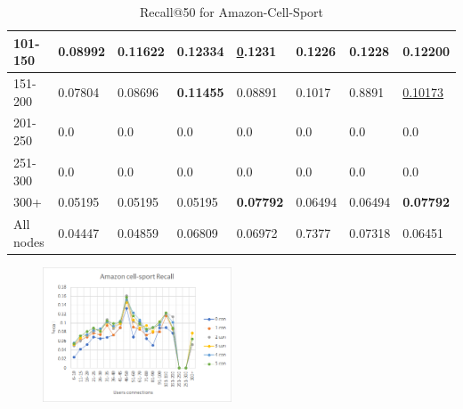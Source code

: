 \begin{table}[]
\begin{tabular}{|l|l|l|l|l|l|l||l|}
        101-150     & 0.08992                        & 0.11622                        & \textbf{0.12334}               & {\ul 0.1231}                   & 0.1226                         & 0.1228                          & 0.12200                    \\ \hline
        151-200     & 0.07804                        & 0.08696                        & \textbf{0.11455}               & 0.08891                        & 0.1017                         & 0.8891                          & \underline{0.10173}        \\ \hline
        201-250     & 0.0                            & 0.0                            & 0.0                            & 0.0                            & 0.0                            & 0.0                             & 0.0                        \\ \hline
        251-300     & 0.0                            & 0.0                            & 0.0                            & 0.0                            & 0.0                            & 0.0                             & 0.0                        \\ \hline
        300+        & 0.05195                        & 0.05195                        & 0.05195                        & \textbf{0.07792}               & 0.06494                        & 0.06494                         & \textbf{0.07792}           \\ \hline
        All nodes     & 0.04447                        & 0.04859                        & 0.06809                        & 0.06972                        & 0.7377                         & 0.07318                         & 0.06451                    \\ \hline
    \end{tabular}
    \caption{Recall@50 for Amazon-Cell-Sport}
    \label{tab:Amazon-Cell-Sport-recall-evaluation}
\end{table}

\begin{figure}[h!]
    \includegraphics[width=0.5\textwidth]{figures/evaluation/amazon-cell-sport-recall.png}
    \centering
    \caption{}
    \label{}
\end{figure}

